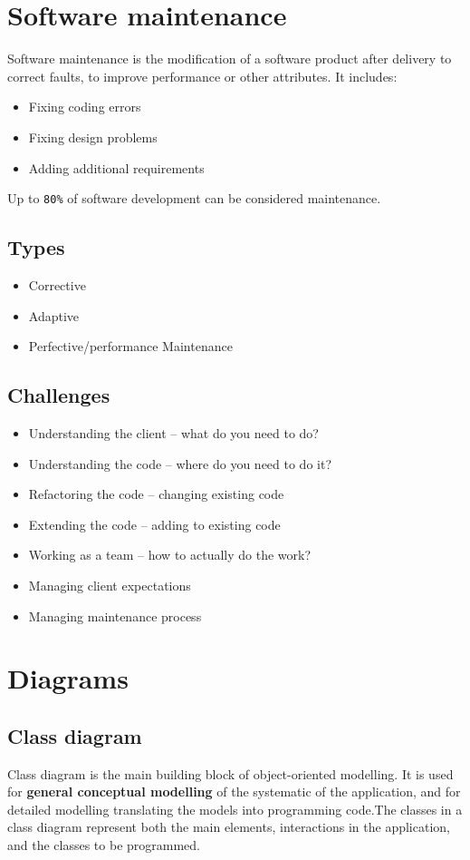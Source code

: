 \documentclass{article}
\begin{document}
\section{Software maintenance}
\begin{flushleft}
Software maintenance is the modification of a software product after delivery to correct faults, to improve performance or other attributes. It includes:
\begin{itemize}
	\item Fixing coding errors
	\item Fixing design problems
	\item Adding additional requirements 
\end{itemize}
Up to \verb!80%! of software development can be considered maintenance.
\end{flushleft}

\subsection{Types}
\begin{itemize}
	\item Corrective
	\item Adaptive
	\item Perfective/performance Maintenance
\end{itemize}

\subsection{Challenges}
\begin{itemize}
	\item Understanding the client – what do you need to do?
	\item Understanding the code – where do you need to do it?
	\item Refactoring the code – changing existing code
	\item Extending the code – adding to existing code
	\item Working as a team – how to actually do the work?
	\item Managing client expectations
	\item Managing maintenance process
\end{itemize}

\section{Diagrams}
\subsection{Class diagram}
\begin{flushleft}
Class diagram is the main building block of object-oriented modelling. It is used for \textbf{general conceptual modelling} of the systematic of the application, and for detailed modelling translating the models into programming code.The classes in a class diagram represent both the main elements, interactions in the application, and the classes to be programmed.
\end{flushleft}
\end{document}
